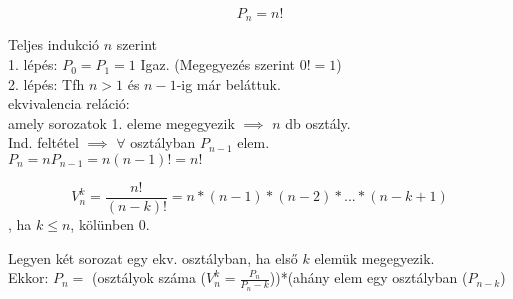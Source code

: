 \documentclass{beamer}
\begin{document}
\begin{frame}
\begin{tcolorbox}[title={Def.: Permutáció}]
\end{tcolorbox}

\begin{tcolorbox}[title={Tétel: Permutációk száma}]
$$P_n = n!$$
\end{tcolorbox}

\begin{tcolorbox}[title={Bizonyítás}]
Teljes indukció $n$ szerint\\
1. lépés: $P_0 = P_1 = 1$ Igaz. (Megegyezés szerint $0! = 1$)\\
2. lépés: Tfh $n > 1$ és $n - 1$-ig már beláttuk.\\
ekvivalencia reláció:\\
amely sorozatok 1. eleme megegyezik $\implies$ $n$ db osztály.\\
Ind. feltétel $\implies$ $\forall$ osztályban $P_{n - 1}$ elem.\\
$P_n = nP_{n - 1} = n(n - 1)! = n!$
\end{tcolorbox}

\begin{tcolorbox}[title={Def.: Ciklikus permutáció}]
\end{tcolorbox}
\end{frame}

\begin{frame}
\begin{tcolorbox}[title={Def.:Ismétlés nélküli variáció}]
\end{tcolorbox}

\begin{tcolorbox}[title={Tétel: Variációk száma}]
$$V_n^k = \frac{n!}{(n - k)!} = n * (n - 1) * (n - 2) * ... * (n - k + 1)$$, ha $k \leq n$, kölünben 0.
\end{tcolorbox}

\begin{tcolorbox}[title={Bizonyítás}]
Legyen két sorozat egy ekv. osztályban, ha első $k$ elemük megegyezik.\\
Ekkor: $P_n = $ (osztályok száma ($V_n^k = \frac{P_n}{P_n - k}$))*(ahány elem egy osztályban ($P_{n - k}$)
\end{tcolorbox}
\end{frame}
\end{document}
